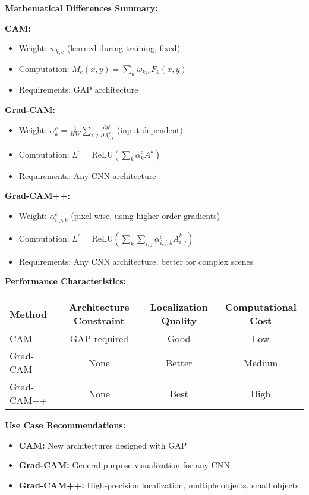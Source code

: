 \documentclass[12pt]{article}
\begin{document}
\begin{enumerate}[(a)]
{    \textbf{Mathematical Differences Summary:}
    
    \textbf{CAM:}
    \begin{itemize}
        \item Weight: $w_{k,c}$ (learned during training, fixed)
        \item Computation: $M_c(x,y) = \sum_k w_{k,c} F_k(x,y)$
        \item Requirements: GAP architecture
    \end{itemize}
    
    \textbf{Grad-CAM:}
    \begin{itemize}
        \item Weight: $\alpha_k^c = \frac{1}{HW} \sum_{i,j} \frac{\partial y^c}{\partial A_{i,j}^k}$ (input-dependent)
        \item Computation: $L^c = \text{ReLU}(\sum_k \alpha_k^c A^k)$
        \item Requirements: Any CNN architecture
    \end{itemize}
    
    \textbf{Grad-CAM++:}
    \begin{itemize}
        \item Weight: $\alpha_{i,j,k}^c$ (pixel-wise, using higher-order gradients)
        \item Computation: $L^c = \text{ReLU}(\sum_k \sum_{i,j} \alpha_{i,j,k}^c A_{i,j}^k)$
        \item Requirements: Any CNN architecture, better for complex scenes
    \end{itemize}
    
    \textbf{Performance Characteristics:}
    
    \begin{center}
    \begin{tabular}{|l|c|c|c|}
    \hline
    Method & Architecture Constraint & Localization Quality & Computational Cost \\
    \hline
    CAM & GAP required & Good & Low \\
    Grad-CAM & None & Better & Medium \\
    Grad-CAM++ & None & Best & High \\
    \hline
    \end{tabular}
    \end{center}
    
    \textbf{Use Case Recommendations:}
    \begin{itemize}
        \item \textbf{CAM:} New architectures designed with GAP
        \item \textbf{Grad-CAM:} General-purpose visualization for any CNN
        \item \textbf{Grad-CAM++:} High-precision localization, multiple objects, small objects
    \end{itemize}
    }
    

\end{enumerate}
\end{document}
